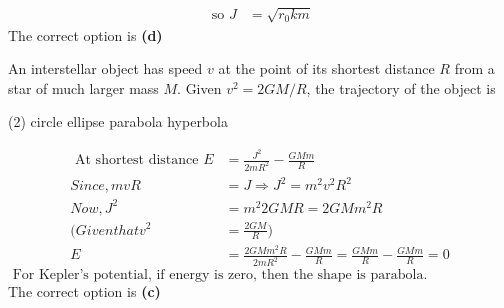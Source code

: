 \begin{enumerate}
\begin{answer}
\begin{align*}
\text { so } J&=\sqrt{r_{0} k m}
\end{align*}
The correct option is \textbf{(d)}	
\end{answer}
\begin{minipage}{\textwidth}
	\item An interstellar object has speed $v$ at the point of its shortest distance $R$ from a star of much larger mass $M$. Given $v^{2}=2 G M / R$, the trajectory of the object is
\end{minipage}
\begin{tasks}(2)
	\task[\textbf{A.}] circle
	\task[\textbf{B.}]ellipse
	\task[\textbf{C.}]parabola
	\task[\textbf{D.}]hyperbola
\end{tasks}
\begin{answer}
	\begin{align*}
	\text { At shortest distance } E&=\frac{J^{2}}{2 m R^{2}}-\frac{G M m}{R}\\
	Since, m v R&=J \Rightarrow J^{2}=m^{2} v^{2} R^{2}\\
	Now, J^{2}&=m^{2} 2 G M R=2 G M m^{2} R\\
	(Given that v^{2}&=\frac{2 G M}{R} )\\
	E&=\frac{2 G M m^{2} R}{2 m R^{2}}-\frac{G M m}{R}=\frac{G M m}{R}-\frac{G M m}{R}=0	
	\end{align*}
	$\text { For Kepler's potential, if energy is zero, then the shape is parabola. }$\\
	The correct option is \textbf{(c)}
\end{answer}

\end{enumerate}